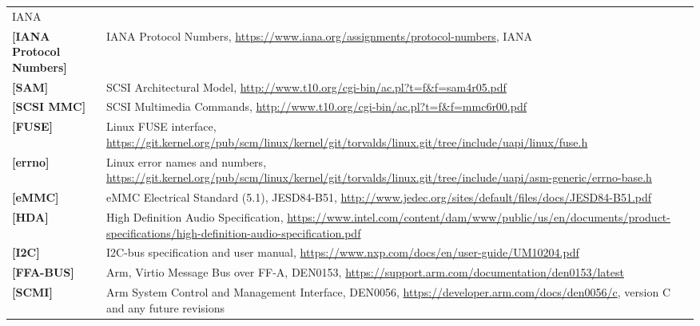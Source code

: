 \begin{longtable}{l p{5in}}
	IANA\\
	\label{intro:IANA Protocol Numbers}\textbf{[IANA Protocol Numbers]} &
	IANA Protocol Numbers,
	\newline\url{https://www.iana.org/assignments/protocol-numbers},
	IANA\\
	\label{intro:SAM}\textbf{[SAM]} &
        SCSI Architectural Model,
        \newline\url{http://www.t10.org/cgi-bin/ac.pl?t=f&f=sam4r05.pdf}\\
	\label{intro:SCSI MMC}\textbf{[SCSI MMC]} &
        SCSI Multimedia Commands,
        \newline\url{http://www.t10.org/cgi-bin/ac.pl?t=f&f=mmc6r00.pdf}\\
	\label{intro:FUSE}\textbf{[FUSE]} &
	Linux FUSE interface,
	\newline\url{https://git.kernel.org/pub/scm/linux/kernel/git/torvalds/linux.git/tree/include/uapi/linux/fuse.h}\\
	\label{intro:errno}\textbf{[errno]} &
	Linux error names and numbers,
	\newline\url{https://git.kernel.org/pub/scm/linux/kernel/git/torvalds/linux.git/tree/include/uapi/asm-generic/errno-base.h}\\
        \label{intro:eMMC}\textbf{[eMMC]} &
        eMMC Electrical Standard (5.1), JESD84-B51,
        \newline\url{http://www.jedec.org/sites/default/files/docs/JESD84-B51.pdf}\\
	\label{intro:HDA}\textbf{[HDA]} &
	High Definition Audio Specification,
	\newline\url{https://www.intel.com/content/dam/www/public/us/en/documents/product-specifications/high-definition-audio-specification.pdf}\\
	\label{intro:I2C}\textbf{[I2C]} &
	I2C-bus specification and user manual,
	\newline\url{https://www.nxp.com/docs/en/user-guide/UM10204.pdf}\\
	\label{intro:FFA-BUS}\textbf{[FFA-BUS]} &
	Arm, Virtio Message Bus over FF-A, DEN0153,
	\newline\url{https://support.arm.com/documentation/den0153/latest}\\
	\label{intro:SCMI}\textbf{[SCMI]} &
	Arm System Control and Management Interface, DEN0056,
	\newline\url{https://developer.arm.com/docs/den0056/c}, version C and any future revisions\\

\end{longtable}
